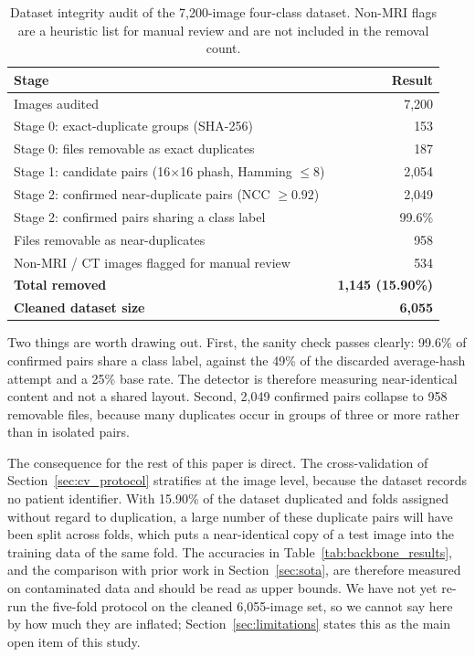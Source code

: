 \documentclass[11pt]{article}
\begin{document}
\begin{table}[htbp]
\centering
\caption{Dataset integrity audit of the 7,200-image four-class dataset. Non-MRI flags are a heuristic list for manual review and are not included in the removal count.}
\label{tab:audit}
\small
\begin{tabular*}{\textwidth}{@{\extracolsep{\fill}}lr@{}}
\toprule
\textbf{Stage} & \textbf{Result} \\
\midrule
Images audited & 7,200 \\
Stage 0: exact-duplicate groups (SHA-256) & 153 \\
Stage 0: files removable as exact duplicates & 187 \\
Stage 1: candidate pairs (16$\times$16 phash, Hamming $\leq 8$) & 2,054 \\
Stage 2: confirmed near-duplicate pairs (NCC $\geq 0.92$) & 2,049 \\
Stage 2: confirmed pairs sharing a class label & 99.6\% \\
Files removable as near-duplicates & 958 \\
Non-MRI / CT images flagged for manual review & 534 \\
\midrule
\textbf{Total removed} & \textbf{1,145 (15.90\%)} \\
\textbf{Cleaned dataset size} & \textbf{6,055} \\
\bottomrule
\end{tabular*}
\end{table}

Two things are worth drawing out. First, the sanity check passes clearly: 99.6\% of confirmed pairs share a class label, against the 49\% of the discarded average-hash attempt and a 25\% base rate. The detector is therefore measuring near-identical content and not a shared layout. Second, 2,049 confirmed pairs collapse to 958 removable files, because many duplicates occur in groups of three or more rather than in isolated pairs.

The consequence for the rest of this paper is direct. The cross-validation of Section~\ref{sec:cv_protocol} stratifies at the image level, because the dataset records no patient identifier. With 15.90\% of the dataset duplicated and folds assigned without regard to duplication, a large number of these duplicate pairs will have been split across folds, which puts a near-identical copy of a test image into the training data of the same fold. The accuracies in Table~\ref{tab:backbone_results}, and the comparison with prior work in Section~\ref{sec:sota}, are therefore measured on contaminated data and should be read as upper bounds. We have not yet re-run the five-fold protocol on the cleaned 6,055-image set, so we cannot say here by how much they are inflated; Section~\ref{sec:limitations} states this as the main open item of this study.
\end{document}
